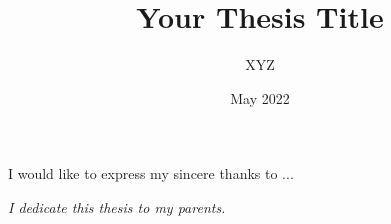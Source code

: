 \documentclass{iitthesis}
\begin{document}
\title{Your Thesis Title}
\author{XYZ}
\date{May 2022}
\copyrightnoticetrue      %
\maketitle                %


\prelimpages         %
\newpage

\begin{acknowledgement}     %

I would like to express my sincere thanks to ...
\begin{center}
\emph{I dedicate this thesis to my parents.}
\end{center}



\end{acknowledgement}



\tableofcontents

\clearpage



\listoffigures

\clearpage


\def\listofsymbols{
 \begin{center}
 \tsp{LIST OF SYMBOLS\\}
 \end{center}
 \ssp
\hbox{\protect\makebox[1.5cm][c]{Symbol}\hspace{3cm}\makebox[10cm][l]{Description}}
 \addcontentsline{toc}{chapter}{\noindent LIST OF SYMBOLS} %
}
\end{document}
